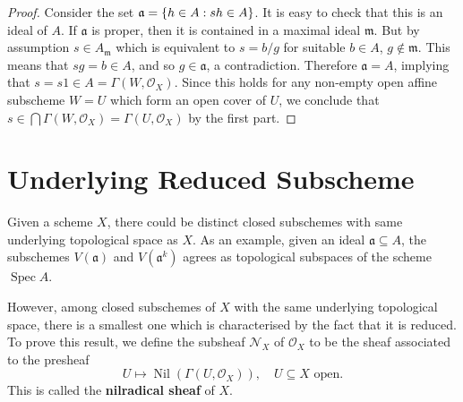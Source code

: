 \documentclass[12pt]{book}
\newcommand{\inlinedef}[1]{\textcolor{oxfordblue}{\bfseries #1}}
\theoremstyle{definition}
\DeclarePairedDelimiter{\Set}{\lbrace}{\rbrace}
\DeclareMathOperator{\Spec}{Spec}
\DeclareMathOperator{\Nil}{Nil} %
\begin{document}
\begin{proof}
		Consider the set $\mathfrak{a} = \Set{h \in A : sh \in A}$. It is easy to check that this is an ideal of $A$. If $\mathfrak{a}$ is proper, then it is contained in a maximal ideal $\mathfrak{m}$. But by assumption $s \in A_{\mathfrak{m}}$ which is equivalent to $s = b/g$ for suitable $b \in A$, $g \notin \mathfrak{m}$. This means that $sg = b \in A$, and so $g \in \mathfrak{a}$, a contradiction. Therefore $\mathfrak{a} = A$, implying that $s = s1 \in A = \Gamma(W, \mathcal{O}_X)$. Since this holds for any non-empty open affine subscheme $W = U$ which form an open cover of $U$, we conclude that $s \in \bigcap \Gamma(W, \mathcal{O}_X) = \Gamma(U, \mathcal{O}_X)$ by the first part.
	\end{proof}
	
	\section{Underlying Reduced Subscheme} 
	
	Given a scheme $X$, there could be distinct closed subschemes with same underlying topological space as $X$. As an example, given an ideal $\mathfrak{a} \subseteq A$, the subschemes $V(\mathfrak{a})$ and $V(\mathfrak{a}^k)$ agrees as topological subspaces of the scheme $\Spec A$. 
	
	However, among closed subschemes of $X$ with the same underlying topological space, there is a smallest one which is characterised by the fact that it is reduced. To prove this result, we define the subsheaf $\mathcal{N}_X$ of $\mathcal{O}_X$ to be the sheaf associated to the presheaf
	\begin{equation*}
		U \mapsto \Nil(\Gamma(U, \mathcal{O}_X)), \quad U \subseteq X \text{ open}.
	\end{equation*}
	This is called the \inlinedef{nilradical sheaf} of $X$.
	
\end{document}
